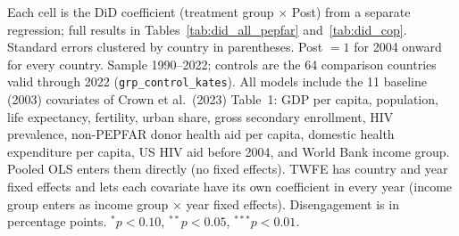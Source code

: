 \begin{table}[htbp]
\begin{minipage}{\textwidth}\footnotesize Each cell is the DiD coefficient (treatment group $\times$ Post) from a separate regression; full results in Tables~\ref{tab:did_all_pepfar} and~\ref{tab:did_cop}. Standard errors clustered by country in parentheses. Post $= 1$ for 2004 onward for every country. Sample 1990--2022; controls are the 64 comparison countries valid through 2022 (\texttt{grp\_control\_kates}). All models include the 11 baseline (2003) covariates of Crown et al.\ (2023) Table~1: GDP per capita, population, life expectancy, fertility, urban share, gross secondary enrollment, HIV prevalence, non-PEPFAR donor health aid per capita, domestic health expenditure per capita, US HIV aid before 2004, and World Bank income group. Pooled OLS enters them directly (no fixed effects). TWFE has country and year fixed effects and lets each covariate have its own coefficient in every year (income group enters as income group $\times$ year fixed effects). Disengagement is in percentage points. $^{*}p<0.10$, $^{**}p<0.05$, $^{***}p<0.01$.\end{minipage}
\end{table}
